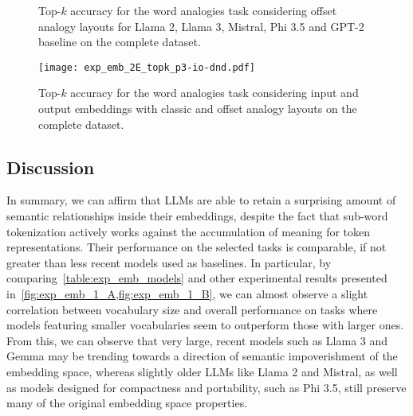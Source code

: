 \begin{figure}[t!]
    \centering
    \caption[Top-$k$ accuracy for the word analogies task considering offset analogy layouts for various models on the complete dataset.]{Top-$k$ accuracy for the word analogies task considering offset analogy layouts for Llama 2, Llama 3, Mistral, Phi 3.5 and GPT-2 baseline on the complete dataset.}
    \label{fig:exp_emb_2_E}
\end{figure}
\begin{figure}[t!]
    \centering
    \texttt{[image: exp\_emb\_2E\_topk\_p3-io-dnd.pdf]}
    \caption{Top-$k$ accuracy for the word analogies task considering input and output embeddings with classic and offset analogy layouts on the complete dataset.}
    \label{fig:exp_emb_2_E3}
\end{figure}

\subsection{Discussion}\label{ssec:exp_emb_discussion}

In summary, we can affirm that LLMs are able to retain a surprising amount of semantic relationships inside their embeddings, despite the fact that sub-word tokenization actively works against the accumulation of meaning for token representations.
Their performance on the selected tasks is comparable, if not greater than less recent models used as baselines.
In particular, by comparing~\cref{table:exp_emb_models} and other experimental results presented in~\cref{fig:exp_emb_1_A,fig:exp_emb_1_B}, we can almost observe a slight correlation between vocabulary size and overall performance on tasks where models featuring smaller vocabularies seem to outperform those with larger ones.
From this, we can observe that very large, recent models such as Llama 3 and Gemma may be trending towards a direction of semantic impoverishment of the embedding space, whereas slightly older LLMs like Llama 2 and Mistral, as well as models designed for  compactness and portability, such as Phi 3.5, still preserve many of the original embedding space properties.

